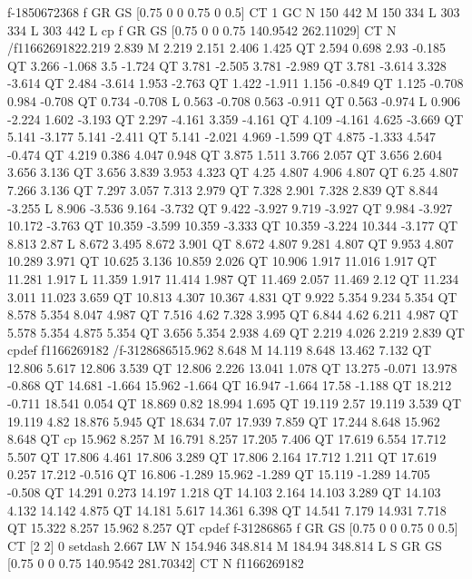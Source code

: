 f-1850672368
f
GR
GS
[0.75 0 0 0.75 0 0.5] CT
1 GC
N
150 442 M
150 334 L
303 334 L
303 442 L
cp
f
GR
GS
[0.75 0 0 0.75 140.9542 262.11029] CT
N
/f1166269182{2.219 2.839 M
2.219 2.151 2.406 1.425 QT
2.594 0.698 2.93 -0.185 QT
3.266 -1.068 3.5 -1.724 QT
3.781 -2.505 3.781 -2.989 QT
3.781 -3.614 3.328 -3.614 QT
2.484 -3.614 1.953 -2.763 QT
1.422 -1.911 1.156 -0.849 QT
1.125 -0.708 0.984 -0.708 QT
0.734 -0.708 L
0.563 -0.708 0.563 -0.911 QT
0.563 -0.974 L
0.906 -2.224 1.602 -3.193 QT
2.297 -4.161 3.359 -4.161 QT
4.109 -4.161 4.625 -3.669 QT
5.141 -3.177 5.141 -2.411 QT
5.141 -2.021 4.969 -1.599 QT
4.875 -1.333 4.547 -0.474 QT
4.219 0.386 4.047 0.948 QT
3.875 1.511 3.766 2.057 QT
3.656 2.604 3.656 3.136 QT
3.656 3.839 3.953 4.323 QT
4.25 4.807 4.906 4.807 QT
6.25 4.807 7.266 3.136 QT
7.297 3.057 7.313 2.979 QT
7.328 2.901 7.328 2.839 QT
8.844 -3.255 L
8.906 -3.536 9.164 -3.732 QT
9.422 -3.927 9.719 -3.927 QT
9.984 -3.927 10.172 -3.763 QT
10.359 -3.599 10.359 -3.333 QT
10.359 -3.224 10.344 -3.177 QT
8.813 2.87 L
8.672 3.495 8.672 3.901 QT
8.672 4.807 9.281 4.807 QT
9.953 4.807 10.289 3.971 QT
10.625 3.136 10.859 2.026 QT
10.906 1.917 11.016 1.917 QT
11.281 1.917 L
11.359 1.917 11.414 1.987 QT
11.469 2.057 11.469 2.12 QT
11.234 3.011 11.023 3.659 QT
10.813 4.307 10.367 4.831 QT
9.922 5.354 9.234 5.354 QT
8.578 5.354 8.047 4.987 QT
7.516 4.62 7.328 3.995 QT
6.844 4.62 6.211 4.987 QT
5.578 5.354 4.875 5.354 QT
3.656 5.354 2.938 4.69 QT
2.219 4.026 2.219 2.839 QT
cp}def
f1166269182
/f-31286865{15.962 8.648 M
14.119 8.648 13.462 7.132 QT
12.806 5.617 12.806 3.539 QT
12.806 2.226 13.041 1.078 QT
13.275 -0.071 13.978 -0.868 QT
14.681 -1.664 15.962 -1.664 QT
16.947 -1.664 17.58 -1.188 QT
18.212 -0.711 18.541 0.054 QT
18.869 0.82 18.994 1.695 QT
19.119 2.57 19.119 3.539 QT
19.119 4.82 18.876 5.945 QT
18.634 7.07 17.939 7.859 QT
17.244 8.648 15.962 8.648 QT
cp
15.962 8.257 M
16.791 8.257 17.205 7.406 QT
17.619 6.554 17.712 5.507 QT
17.806 4.461 17.806 3.289 QT
17.806 2.164 17.712 1.211 QT
17.619 0.257 17.212 -0.516 QT
16.806 -1.289 15.962 -1.289 QT
15.119 -1.289 14.705 -0.508 QT
14.291 0.273 14.197 1.218 QT
14.103 2.164 14.103 3.289 QT
14.103 4.132 14.142 4.875 QT
14.181 5.617 14.361 6.398 QT
14.541 7.179 14.931 7.718 QT
15.322 8.257 15.962 8.257 QT
cp}def
f-31286865
f
GR
GS
[0.75 0 0 0.75 0 0.5] CT
[2 2] 0 setdash
2.667 LW
N
154.946 348.814 M
184.94 348.814 L
S
GR
GS
[0.75 0 0 0.75 140.9542 281.70342] CT
N
f1166269182

